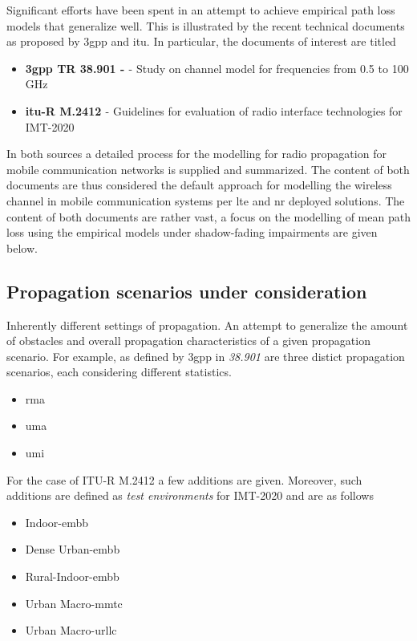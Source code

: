 Significant efforts have been spent in an attempt to achieve empirical path loss models that generalize well. This is illustrated by the recent technical documents as proposed by \gls{3gpp} and \gls{itu}. In particular, the documents of interest are titled

\begin{itemize}
\item \textbf{\gls{3gpp} TR 38.901 - \cite{3GPP38901}} - Study on channel model for frequencies from 0.5 to 100 GHz
\item \textbf{\gls{itu}-R M.2412 \cite{ITU2412}} - Guidelines for evaluation of radio interface technologies for IMT-2020
\end{itemize}

In both sources a detailed process for the modelling for radio propagation for mobile communication networks is supplied and summarized. The content of both documents are thus considered the default approach for modelling the wireless channel in mobile communication systems per \gls{lte} and \gls{nr} deployed solutions. The content of both documents are rather vast, a focus on the modelling of mean path loss using the empirical models under shadow-fading impairments are given below.

\subsection{Propagation scenarios under consideration}
Inherently different settings of propagation. An attempt to generalize the amount of obstacles and overall propagation characteristics of a given propagation scenario. For example, as defined by \gls{3gpp} in \emph{38.901} are three distict propagation scenarios, each considering different statistics. 

\begin{itemize}
    \item \gls{rma}
    \item \gls{uma}
    \item \gls{umi}
\end{itemize}

For the case of ITU-R M.2412 \cite{ITU2412} a few additions are given. Moreover, such additions are defined as \emph{test environments} for IMT-2020 and are as follows
\begin{itemize}
    \item Indoor-\gls{embb}
    \item Dense Urban-\gls{embb}
    \item Rural-Indoor-\gls{embb}
    \item Urban Macro-\gls{mmtc}
    \item Urban Macro-\gls{urllc}
\end{itemize}


